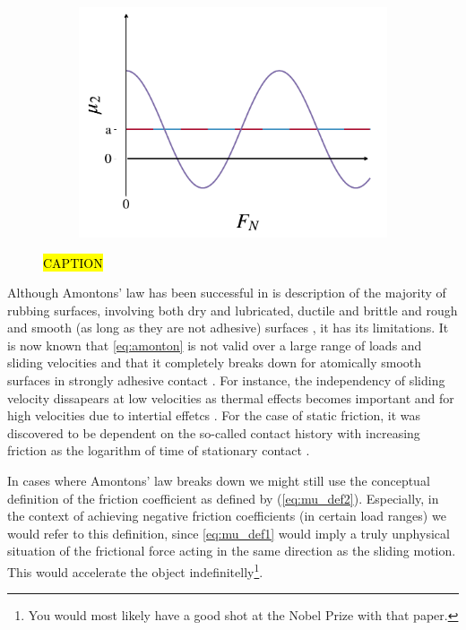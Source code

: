 \begin{figure}[H]
\begin{subfigure}[t]{0.32\textwidth}
      \caption{}
      \label{fig:fric_coef_example_b}
    \end{subfigure}
    \hfill
    \begin{subfigure}[t]{0.32\textwidth}
      \centering
      \includegraphics[width=\textwidth]{figures/theory/fric_coef_example_c.pdf}
      \caption{}
      \label{fig:fric_coef_example_c}
  \end{subfigure}
  \hfill
  \caption{\hl{CAPTION}}
  \label{fig:fric_coef_example}
\end{figure}


Although Amontons' law has been successful in is description of the majority of
rubbing surfaces, involving both dry and lubricated, ductile and brittle and
rough and smooth (as long as they are not adhesive) surfaces
\cite{gao_frictional_2004}, it has its limitations. It is now known that
\cref{eq:amonton} is not valid over a large range of loads and sliding
velocities and that it completely breaks down for atomically smooth surfaces in
strongly adhesive contact \cite{gao_frictional_2004}. For instance, the
independency of sliding velocity dissapears at low velocities as thermal effects
becomes important and for high velocities due to intertial effetcs \cite[pp.
5-6]{gnecco_meyer_2015}. For the case of static friction, it was discovered to
be dependent on the so-called contact history with increasing friction as the
logarithm of time of stationary contact \cite{dieterich_1972}.

In cases where Amontons' law breaks down we might still use the conceptual
definition of the friction coefficient as defined by (\cref{eq:mu_def2}).
Especially, in the context of achieving negative friction coefficients (in
certain load ranges) we would refer to this definition, since \cref{eq:mu_def1}
would imply a truly unphysical situation of the frictional force acting in the
same direction as the sliding motion. This would accelerate the object
indefinitelly\footnote{You would most likely have a good shot at the Nobel Prize
with that paper.}.


